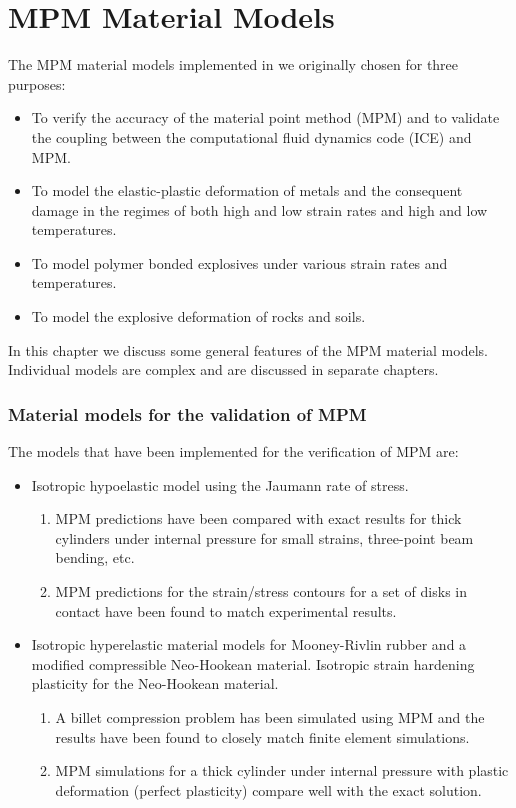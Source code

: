
\chapter{MPM Material Models}
The MPM material models implemented in \Vaango we originally
chosen for three purposes:
\begin{itemize}
  \item To verify the accuracy of the material point method (MPM)
        and to validate the coupling between the computational fluid 
        dynamics code (ICE) and MPM.
  \item To model the elastic-plastic deformation of metals 
        and the consequent damage in the regimes of 
        both high and low strain rates and high and low temperatures.
  \item To model polymer bonded explosives 
        under various strain rates and temperatures.
  \item To model the explosive deformation of rocks and soils.
\end{itemize}
In this chapter we discuss some general features of the MPM material
models.  Individual models are complex and are discussed in separate
chapters.

\subsection{Material models for the validation of MPM}
The models that have been implemented for the verification of MPM
are:
\begin{itemize}
   \item Isotropic hypoelastic model using the Jaumann rate of 
         stress.
     \begin{enumerate}
        \item  MPM predictions have been compared with exact results 
               for thick cylinders under internal pressure for small
               strains, three-point beam bending, etc.
        \item  MPM predictions for the strain/stress contours for
               a set of disks in contact have been found to match
               experimental results.
     \end{enumerate}
   \item Isotropic hyperelastic material models for Mooney-Rivlin
         rubber and a modified compressible Neo-Hookean material. 
         Isotropic strain hardening plasticity for the Neo-Hookean
         material.
     \begin{enumerate}
        \item  A billet compression problem has been simulated using
               MPM and the results have been found to closely 
               match finite element simulations.
        \item  MPM simulations for a thick cylinder under internal
               pressure with plastic deformation (perfect plasticity)
               compare well with the exact solution.
     \end{enumerate}
\end{itemize}


